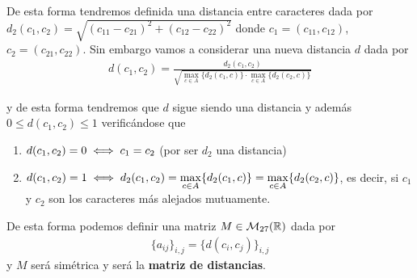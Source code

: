 \documentclass[12pt]{article}
\begin{document}
De esta forma tendremos definida una distancia entre caracteres dada por $d_2(c_1, c_2) = \sqrt{(c_{11} - c_{21})^2 + (c_{12} - c_{22})^2}$ donde $c_1=(c_{11}, c_{12})$, $c_2=(c_{21}, c_{22})$. Sin embargo vamos a considerar una nueva distancia $d$ dada por 
\begin{align*}
    d(c_1, c_2) = \frac{d_2(c_1, c_2)}{\sqrt{\max\limits_{c\in A}\{d_2(c_1, c)\} \cdot \max\limits_{c\in A}\{d_2(c_2, c)\}}}
\end{align*}

y de esta forma tendremos que $d$ sigue siendo una distancia y además $0 \leq d(c_1, c_2) \leq 1$ verificándose que 
\begin{enumerate}
    \item $d(c_1, c_2) = 0 \iff c_1=c_2$ (por ser $d_2$ una distancia)
    \item $d(c_1, c_2) = 1 \iff d_2(c_1, c_2) =\max\limits_{c\in A}\{d_2(c_1, c)\} = \max\limits_{c\in A}\{d_2(c_2, c)\}$, es decir, si $c_1$ y $c_2$ son los caracteres más alejados mutuamente.
\end{enumerate}

De esta forma podemos definir una matriz $M\in \mathcal{M}_{27}(\mathbb{R})$ dada por 
\begin{align*}
    \{a_{ij}\}_{i,j} = \{d(c_i, c_j)\}_{i,j}
\end{align*}
y $M$ será simétrica y será la \textbf{matriz de distancias}.
\end{document}
